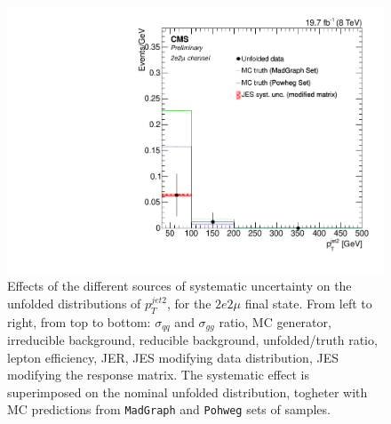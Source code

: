 \begin{figure}[hbtp]
\begin{center}
   \includegraphics[width=0.8\cmsFigWidth]{Figures/Unfolding/Systematics/ZZTo2e2m_PtJet2_JES_ModMat_Mad_fr}
   \caption{Effects of the different sources of systematic uncertainty on the unfolded distributions of $p_{T}^{jet2}$, for the     
   $2e2\mu$ final state. From left to right, from top to bottom: $\sigma_{qq}$ and $\sigma_{gg}$ ratio, MC generator, irreducible background, reducible background, unfolded/truth ratio, lepton efficiency, JER, JES modifying data distribution, JES modifying the response matrix. The systematic effect is superimposed on the nominal unfolded distribution, togheter with MC predictions from \texttt{MadGraph} and \texttt{Pohweg} sets of samples.}
   \label{fig:PtJet2syst2e2m}
 \end{center}
\end{figure}
